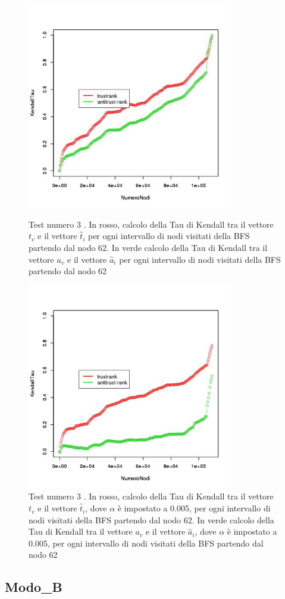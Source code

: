 \begin{figure}
\centering
 \includegraphics[height=9cm]{immagini/test3/coplotTrustAnti_Mode0_62_set3776}
 \caption{Test numero 3 . In rosso, calcolo della Tau di Kendall tra il vettore $t_v$ e il vettore $\hat{t}_i$ per ogni intervallo di nodi visitati della BFS partendo dal nodo 62. In verde calcolo della Tau di Kendall tra il vettore $a_v$ e il vettore $\hat{a}_i$ per ogni intervallo di nodi visitati della BFS partendo dal nodo 62}
 \label{fig:test3coplotTrustAntiModeA62}
\centering
 \includegraphics[height=9cm]{immagini/test3/coplotTrustAnti_alpha0005_Mode0_62_set3776}
  \caption{Test numero 3 . In rosso, calcolo della Tau di Kendall tra il vettore $t_v$ e il vettore $\hat{t}_i$, dove $\alpha$ è impostato a 0.005, per ogni intervallo di nodi visitati della BFS partendo dal nodo 62. In verde calcolo della Tau di Kendall tra il vettore $a_v$ e il vettore $\hat{a}_i$, dove $\alpha$ è impostato a 0.005, per ogni intervallo di nodi visitati della BFS partendo dal nodo 62}
 \label{fig:test3coplotTrustAntiModeA620005}
\end{figure}

\subsection{Modo\_B}
